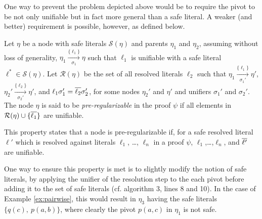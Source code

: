\noindent
One way to prevent the problem depicted above would be to require the pivot to be not only unifiable but in fact more general than a safe literal. A weaker (and better) requirement is possible, however, as defined below.


\begin{definition}
\label{prop:pair}
Let $\eta$ be a node with safe literals $\mathcal{S}(\eta)$ and parents $\eta_1$ and $\eta_2$, assuming without loss of generality, $\eta_1 \xrightarrow[\sigma_1]{\{\ell_1\} } \eta$ such that $\ell_1$ is unifiable with a safe literal $\ell^* \in \mathcal{S}(\eta)$. 
Let $\mathcal{R}(\eta)$ be the set of all resolved literals $\ell_2$ such that $\eta_1 \xrightarrow[\sigma_1']{\{\ell_1\} } \eta'$, $\eta_2' \xrightarrow[\sigma_2']{\{\ell_2\} } \eta'$, and $\ell_1\sigma_1'=\overline{\ell_2}\sigma_2'$, for some nodes $\eta_2'$ and $\eta'$ and unifiers $\sigma_1'$ and $\sigma_2'$.
The node $\eta$ is said to be \emph{pre-regularizable} in the proof $\psi$ if all elements in $\mathcal{R}(\eta) \cup \{ \overline{\ell_1}\}$ are unifiable.
\end{definition}

\noindent
This property states that a node is pre-regularizable if, for a safe resolved literal $\ell'$ which is resolved against literals $\ell_1$, \ldots, $\ell_n$ in a proof $\psi$, $\ell_1$,\ldots,$\ell_n$, and $\overline{\ell'}$ are unifiable.

One way to ensure this property is met is to slightly modify the notion of safe literals, by applying the unifier of the resolution step to the each pivot before adding it to the set of safe literals (cf. algorithm 3, lines 8 and 10). In the case of Example \ref{ex:pairwise}, this would result in $\eta_3$ having the safe literals $\{q(c),~p(a,b)\}$, where clearly the pivot $p(a,c)$ in $\eta_1$ is not safe.


